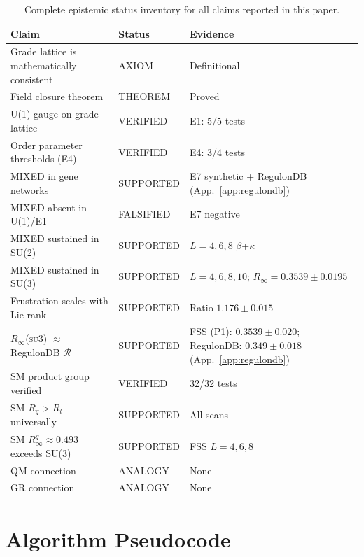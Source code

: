 \documentclass[12pt,a4paper]{article}
\newcommand{\R}{\mathcal{R}}           %
\theoremstyle{plain}
\theoremstyle{definition}
\theoremstyle{remark}
\begin{document}
\begin{table}[H]
\centering
\caption{Complete epistemic status inventory for all claims reported in this paper.}
\begin{tabular}{p{6cm}lp{5cm}}
\toprule
Claim & Status & Evidence \\
\midrule
Grade lattice is mathematically consistent & AXIOM & Definitional \\
Field closure theorem & THEOREM & Proved \\
U(1) gauge on grade lattice & VERIFIED & E1: 5/5 tests \\
Order parameter thresholds (E4) & VERIFIED & E4: 3/4 tests \\
MIXED in gene networks & SUPPORTED & E7 synthetic + RegulonDB (App.~\ref{app:regulondb}) \\
MIXED absent in U(1)/E1 & FALSIFIED & E7 negative \\
MIXED sustained in SU(2) & SUPPORTED & $L=4,6,8$ $\beta$+$\kappa$ \\
MIXED sustained in SU(3) & SUPPORTED & $L=4,6,8,10$; $R_\infty=0.3539\pm0.0195$ \\
Frustration scales with Lie rank & SUPPORTED & Ratio $1.176\pm0.015$ \\
$R_\infty$(\textsc{su3}) $\approx$ RegulonDB $\R$ & SUPPORTED & FSS (P1): $0.3539\pm0.020$; RegulonDB: $0.349\pm0.018$ (App.~\ref{app:regulondb}) \\
SM product group verified & VERIFIED & 32/32 tests \\
SM $R_q>R_l$ universally & SUPPORTED & All scans \\
SM $R_\infty^q\approx0.493$ exceeds SU(3) & SUPPORTED & FSS $L=4,6,8$ \\
QM connection & ANALOGY & None \\
GR connection & ANALOGY & None \\
\bottomrule
\end{tabular}
\end{table}

\section{Algorithm Pseudocode}
\label{app:algo}
\end{document}
